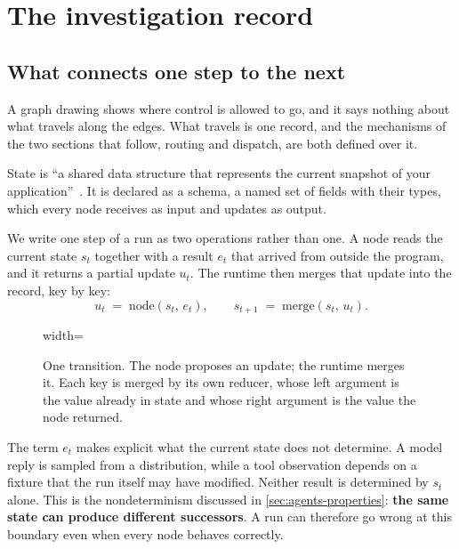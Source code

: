 \section{The investigation record}
\label{sec:state}

\subsection{What connects one step to the next}
\label{sec:state-transition}

A graph drawing shows where control is allowed to go, and it says nothing about what travels along
the edges. What travels is one record, and the mechanisms of the two sections that follow, routing
and dispatch, are both defined over it.

\begin{definition}
\label{def:state}
State is ``a shared data structure that represents the current snapshot of your
application''~\citep{langgraph-graph-api}. It is declared as a schema, a named set of fields with
their types, which every node receives as input and updates as output.
\end{definition}

We write one step of a run as two operations rather than one. A node reads the current state
$s_t$ together with a result $e_t$ that arrived from outside the program, and it returns a partial
update $u_t$. The runtime then merges that update into the record, key by key:
\[
  u_t \;=\; \mathrm{node}(s_t,\, e_t), \qquad
  s_{t+1} \;=\; \mathrm{merge}(s_t,\, u_t).
\]

\begin{figure}[htbp]
  \centering
  \begin{adjustbox}{width=\linewidth}\end{adjustbox}
  \caption{One transition. The node proposes an update; the runtime merges it. Each key is merged
  by its own reducer, whose left argument is the value already in state and whose right argument is
  the value the node returned.}
  \label{fig:state-transition}
\end{figure}

The term $e_t$ makes explicit what the current state does not determine. A model reply is sampled
from a distribution, while a tool observation depends on a fixture that the run itself may have
modified. Neither result is determined by $s_t$ alone. This is the nondeterminism discussed in
\cref{sec:agents-properties}: \textbf{the same state can produce different successors}. A run can
therefore go wrong at this boundary even when every node behaves correctly.

